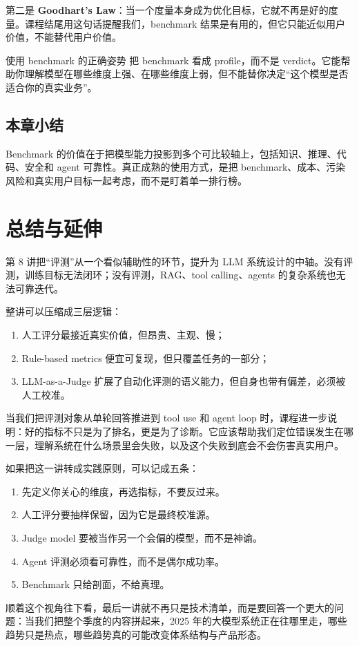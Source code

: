 \documentclass[a4paper]{article}
\begin{document}
第二是 \textbf{Goodhart's Law}：当一个度量本身成为优化目标，它就不再是好的度量。课程结尾用这句话提醒我们，benchmark 结果是有用的，但它只能近似用户价值，不能替代用户价值。

\begin{warningbox}{使用 benchmark 的正确姿势}
把 benchmark 看成 profile，而不是 verdict。它能帮助你理解模型在哪些维度上强、在哪些维度上弱，但不能替你决定“这个模型是否适合你的真实业务”。
\end{warningbox}

\subsection{本章小结}

Benchmark 的价值在于把模型能力投影到多个可比较轴上，包括知识、推理、代码、安全和 agent 可靠性。真正成熟的使用方式，是把 benchmark、成本、污染风险和真实用户目标一起考虑，而不是盯着单一排行榜。

\section{总结与延伸}

第 8 讲把“评测”从一个看似辅助性的环节，提升为 LLM 系统设计的中轴。没有评测，训练目标无法闭环；没有评测，RAG、tool calling、agents 的复杂系统也无法可靠迭代。

整讲可以压缩成三层逻辑：

\begin{enumerate}
\item 人工评分最接近真实价值，但昂贵、主观、慢；
\item Rule-based metrics 便宜可复现，但只覆盖任务的一部分；
\item LLM-as-a-Judge 扩展了自动化评测的语义能力，但自身也带有偏差，必须被人工校准。
\end{enumerate}

当我们把评测对象从单轮回答推进到 tool use 和 agent loop 时，课程进一步说明：好的指标不只是为了排名，更是为了诊断。它应该帮助我们定位错误发生在哪一层，理解系统在什么场景里会失败，以及这个失败到底会不会伤害真实用户。

如果把这一讲转成实践原则，可以记成五条：

\begin{enumerate}
\item 先定义你关心的维度，再选指标，不要反过来。
\item 人工评分要抽样保留，因为它是最终校准源。
\item Judge model 要被当作另一个会偏的模型，而不是神谕。
\item Agent 评测必须看可靠性，而不是偶尔成功率。
\item Benchmark 只给剖面，不给真理。
\end{enumerate}

顺着这个视角往下看，最后一讲就不再只是技术清单，而是要回答一个更大的问题：当我们把整个季度的内容拼起来，2025 年的大模型系统正在往哪里走，哪些趋势只是热点，哪些趋势真的可能改变体系结构与产品形态。
\end{document}
